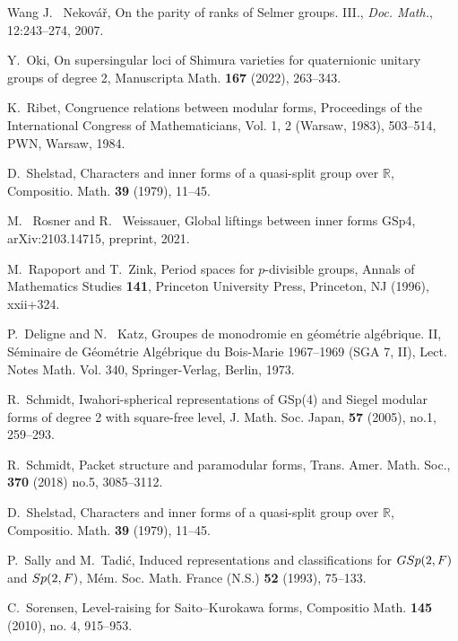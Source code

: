\documentclass[10pt]{amsart}
\numberwithin{equation}{section}
\theoremstyle{definition}
\def\RR{\mathbb{R}}
\begin{document}
\begin{thebibliography}{Wang}
J.~ Nekov{\'a}{\v{r}}, {On the parity of ranks of {S}elmer groups. {III}.}, {\em Doc. Math.}, 12:243--274, 2007.

 Y.~Oki, {On supersingular loci of Shimura varieties for quaternionic
 unitary groups of degree 2}, {Manuscripta Math.}  {\bf 167} (2022), 263--343.
    
K.~Ribet, {Congruence relations between modular forms}, {Proceedings of the International Congress of Mathematicians}, {Vol. 1, 2 (Warsaw, 1983)}, 503--514, {PWN, Warsaw}, 1984. 

D.~Shelstad, {Characters and inner forms of a quasi-split group over $\RR$}, {Compositio. Math.} {\bf 39} (1979), 11--45. 

M.~ Rosner and R.~ Weissauer, {Global liftings between inner forms GSp4},
{arXiv:2103.14715}, preprint, 2021.    

M.~Rapoport and T.~Zink, {Period spaces for {$p$}-divisible groups}, {Annals of Mathematics Studies} {\bf 141}, { Princeton University Press, Princeton, NJ} (1996), xxii+324.     

P.~Deligne and N.~ Katz, {Groupes de monodromie en g\'eom\'etrie alg\'ebrique. {II}}, {S{\'e}minaire de G{\'e}om{\'e}trie Alg{\'e}brique du Bois-Marie 1967--1969 (SGA 7, {II})}, {Lect. Notes Math. Vol. 340},  {Springer-Verlag, Berlin}, 1973.

R.~Schmidt, {Iwahori-spherical representations of GSp(4) and Siegel
   modular forms of degree 2 with square-free level}, {J. Math. Soc. Japan}, {\bf 57} (2005), {no.1}, 259--293.  

R.~Schmidt, {Packet structure and paramodular forms}, {Trans. Amer. Math. Soc.}, {\bf 370} (2018) {no.5}, 3085--3112.

D.~Shelstad, {Characters and inner forms of a quasi-split group over $\RR$}, {Compositio. Math.} {\bf 39} (1979), 11--45.

P.~Sally and M.~Tadi\'{c}, {Induced representations and classifications for {${\rm GSp}(2,F)$} and {${\rm Sp}(2,F)$}}, {M\'{e}m. Soc. Math. France (N.S.)} {\bf 52} (1993), 75--133.

 C.~Sorensen, {Level-raising for Saito--Kurokawa forms}, {Compositio Math.}  {\bf 145} (2010), {no. 4}, 915--953.
 

\end{thebibliography}
\end{document}
